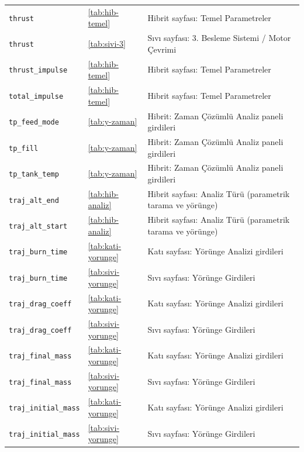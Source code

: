 \documentclass[11pt,a4paper]{article}
\begin{document}
{\begin{longtable}{@{}>{\raggedright\arraybackslash}p{5.2cm}p{1.4cm}>{\raggedright\arraybackslash}p{7.4cm}@{}}
\texttt{thrust} & \ref{tab:hib-temel} & Hibrit sayfası: Temel Parametreler \\
\texttt{thrust} & \ref{tab:sivi-3} & Sıvı sayfası: 3. Besleme Sistemi / Motor Çevrimi \\
\texttt{thrust\_\allowbreak{}impulse} & \ref{tab:hib-temel} & Hibrit sayfası: Temel Parametreler \\
\texttt{total\_\allowbreak{}impulse} & \ref{tab:hib-temel} & Hibrit sayfası: Temel Parametreler \\
\texttt{tp\_\allowbreak{}feed\_\allowbreak{}mode} & \ref{tab:y-zaman} & Hibrit: Zaman Çözümlü Analiz paneli girdileri \\
\texttt{tp\_\allowbreak{}fill} & \ref{tab:y-zaman} & Hibrit: Zaman Çözümlü Analiz paneli girdileri \\
\texttt{tp\_\allowbreak{}tank\_\allowbreak{}temp} & \ref{tab:y-zaman} & Hibrit: Zaman Çözümlü Analiz paneli girdileri \\
\texttt{traj\_\allowbreak{}alt\_\allowbreak{}end} & \ref{tab:hib-analiz} & Hibrit sayfası: Analiz Türü (parametrik tarama ve yörünge) \\
\texttt{traj\_\allowbreak{}alt\_\allowbreak{}start} & \ref{tab:hib-analiz} & Hibrit sayfası: Analiz Türü (parametrik tarama ve yörünge) \\
\texttt{traj\_\allowbreak{}burn\_\allowbreak{}time} & \ref{tab:kati-yorunge} & Katı sayfası: Yörünge Analizi girdileri \\
\texttt{traj\_\allowbreak{}burn\_\allowbreak{}time} & \ref{tab:sivi-yorunge} & Sıvı sayfası: Yörünge Girdileri \\
\texttt{traj\_\allowbreak{}drag\_\allowbreak{}coeff} & \ref{tab:kati-yorunge} & Katı sayfası: Yörünge Analizi girdileri \\
\texttt{traj\_\allowbreak{}drag\_\allowbreak{}coeff} & \ref{tab:sivi-yorunge} & Sıvı sayfası: Yörünge Girdileri \\
\texttt{traj\_\allowbreak{}final\_\allowbreak{}mass} & \ref{tab:kati-yorunge} & Katı sayfası: Yörünge Analizi girdileri \\
\texttt{traj\_\allowbreak{}final\_\allowbreak{}mass} & \ref{tab:sivi-yorunge} & Sıvı sayfası: Yörünge Girdileri \\
\texttt{traj\_\allowbreak{}initial\_\allowbreak{}mass} & \ref{tab:kati-yorunge} & Katı sayfası: Yörünge Analizi girdileri \\
\texttt{traj\_\allowbreak{}initial\_\allowbreak{}mass} & \ref{tab:sivi-yorunge} & Sıvı sayfası: Yörünge Girdileri \\

\end{longtable}}
\end{document}
